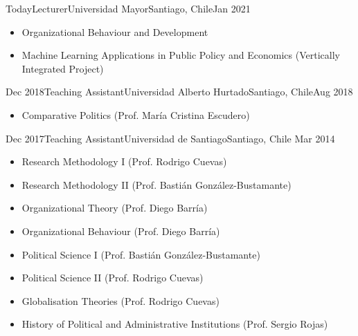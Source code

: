 





\begin{experiences}
  \experience
    {Today}{Lecturer}{Universidad Mayor}{Santiago, Chile}{Jan 2021}
    {\begin{itemize}
    \item Organizational Behaviour and Development
    \item Machine Learning Applications in Public Policy and Economics (Vertically Integrated Project)
    \end{itemize}}
    {}
\end{experiences}
\vspace{-2mm}

\begin{experiences}
  \experience
    {Dec 2018}{Teaching Assistant}{Universidad Alberto Hurtado}{Santiago, Chile}{Aug 2018}
    {\begin{itemize}
    \item Comparative Politics {\small (Prof. María Cristina Escudero)}
    \end{itemize}}
    {}
\end{experiences}
\vspace{-2mm}

\begin{experiences}
  \emptySeparator 
  \experience 
    {Dec 2017}{Teaching Assistant}{Universidad de Santiago}{Santiago, Chile} {Mar 2014}
    {\begin{itemize}
    \item Research Methodology I {\small (Prof. Rodrigo Cuevas)}
    \item Research Methodology II {\small (Prof. Bastián González-Bustamante)}
    \item Organizational Theory {\small (Prof. Diego Barría)}
    \item Organizational Behaviour {\small (Prof. Diego Barría)}
    \item Political Science I {\small (Prof. Bastián González-Bustamante)}
    \item Political Science II {\small (Prof. Rodrigo Cuevas)}
	\item Globalisation Theories {\small (Prof. Rodrigo Cuevas)}
	\item History of Political and Administrative Institutions {\small (Prof. Sergio Rojas)}
    \end{itemize}}
    {}
\end{experiences}
\vspace{-2mm}

